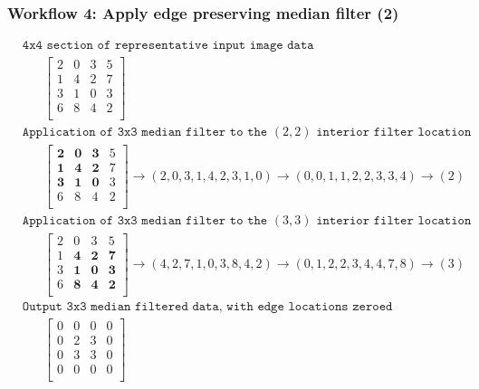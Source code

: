 \documentclass[19pt]{beamer}
\begin{document}
\begin{frame}
\frametitle{Workflow 4: Apply edge preserving median filter (2)}

\fontsize{8.5}{8.5}\selectfont

\vspace*{-10pt}
\begin{equation*}
\begin{aligned}
&\texttt{4x4 section of representative input image data}\\
& \hspace{20pt} \begin{bmatrix}
2 & 0 & 3 & 5 \\
1 & 4 & 2 & 7 \\
3 & 1 & 0 & 3 \\
6 & 8 & 4 & 2 \\ 
\end{bmatrix} \\[5pt]
%
& \texttt{Application of 3x3 median filter to the $(2,2)$ interior filter location}\\
& \hspace{20pt} \begin{bmatrix}
\mathbf{2} & \mathbf{0} & \mathbf{3} & 5 \\
\mathbf{1} & \mathbf{4} & \mathbf{2} & 7 \\
\mathbf{3} & \mathbf{1} & \mathbf{0} & 3 \\
6 & 8 & 4 & 2 \\ 
\end{bmatrix} 
\rightarrow (2, 0, 3, 1, 4, 2, 3, 1, 0) \rightarrow (0, 0, 1, 1, 2, 2, 3, 3, 4) \rightarrow (2) \\[5pt]
%
& \texttt{Application of 3x3 median filter to the $(3,3)$ interior filter location}\\
& \hspace{20pt} \begin{bmatrix}
2 & 0 & 3 & 5 \\
1 & \mathbf{4} & \mathbf{2} & \mathbf{7} \\
3 & \mathbf{1} & \mathbf{0} & \mathbf{3} \\
6 & \mathbf{8} & \mathbf{4} & \mathbf{2} \\ 
\end{bmatrix} 
\rightarrow (4, 2, 7, 1, 0, 3, 8, 4, 2) \rightarrow (0, 1, 2, 2, 3, 4, 4, 7, 8) \rightarrow (3) \\[5pt]
%
& \texttt{Output 3x3 median filtered data, with edge locations zeroed}\\
& \hspace{20pt} \begin{bmatrix}
0 & 0 & 0 & 0 \\
0 & 2 & 3 & 0 \\
0 & 3 & 3 & 0 \\
0 & 0 & 0 & 0 \\ 
\end{bmatrix}
\end{aligned}
\end{equation*}

\end{frame}
\end{document}
